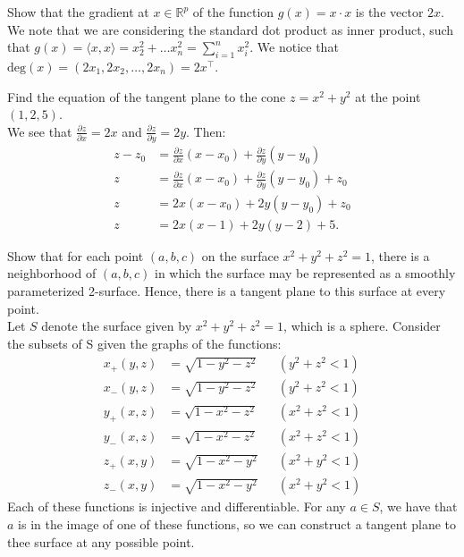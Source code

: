\documentclass[12pt]{book}
\newcommand{\R}{\mathbb{R}}
\newenvironment{exercise}[2][Exercise]{\begin{trivlist}
\item[\hskip \labelsep {\bfseries #1}\hskip \labelsep {\bfseries #2.}]}{\end{trivlist}}
\begin{document}
\begin{exercise}{9.4.6}
    Show that the gradient  at $x \in \R^p$ of the function $g(x) = x \cdot x$ is the vector $2x$. \\

    We note that we are considering the standard dot product as inner product, such that $g(x) = \langle x, x \rangle = x_2^2 + \hdots x_n^2 = \sum_{i=1}^n x_i^2$. We notice that $\text{deg}(x) = (2 x_1, 2x_2, \hdots, 2 x_n) = 2 x^\intercal$.
\end{exercise}


\begin{exercise}{9.4.11}
    Find the equation of the tangent plane to the cone $z = x^2 + y^2$ at the point $(1,2,5)$. \\
    
    We see that $\frac{\partial z}{\partial x}= 2x$ and $\frac{\partial z}{\partial y} = 2y$. Then:
    \begin{align*}
    z - z_0 &= \frac{\partial z}{\partial x}(x-x_0) + \frac{\partial z}{\partial y} (y-y_0)\\
    z &= \frac{\partial z}{\partial x}(x-x_0) + \frac{\partial z}{\partial y} (y-y_0 ) + z_0 \\
    z &= 2 x (x - x_0) + 2 y (y-y_0) + z_0 \\
    z &= 2 x (x -1) + 2 y(y-2) + 5.
    \end{align*}
\end{exercise}

\begin{exercise}{9.4.12}
    Show that for each point $(a,b,c)$ on the surface $x^2 + y^2 + z^2 =1$, there is a neighborhood of $(a,b,c)$ in which the surface may be represented as a smoothly parameterized 2-surface. Hence, there is a tangent plane to this surface at every point. \\

    Let $S$ denote the surface given by $x^2 + y^2 + z^2 =1$, which is a sphere. Consider the subsets of S given the graphs of the functions:
    \begin{align*}
        x_+ (y,z) &= \sqrt{ 1 - y^2 - z^2 } && (y^2 + z^2 < 1) \\
        x_- (y,z) &= \sqrt{ 1 - y^2 - z^2 } && (y^2 + z^2 < 1) \\
        y_+ (x,z) &= \sqrt{ 1 - x^2 - z^2 } && (x^2 + z^2 < 1) \\
        y_- (x,z) &= \sqrt{ 1 - x^2 - z^2 } && (x^2 + z^2 < 1) \\
        z_+ (x,y) &= \sqrt{ 1 - x^2 - y^2 } && (x^2 + y^2 < 1) \\
        z_- (x,y) &= \sqrt{ 1 - x^2 - y^2 } && (x^2 + y^2 < 1)
    \end{align*}
    Each of these functions is injective and differentiable. For any $a \in S$, we have that $a$ is in the image of one of these functions, so we can construct a tangent plane to thee surface at any possible point.
\end{exercise}
\end{document}
